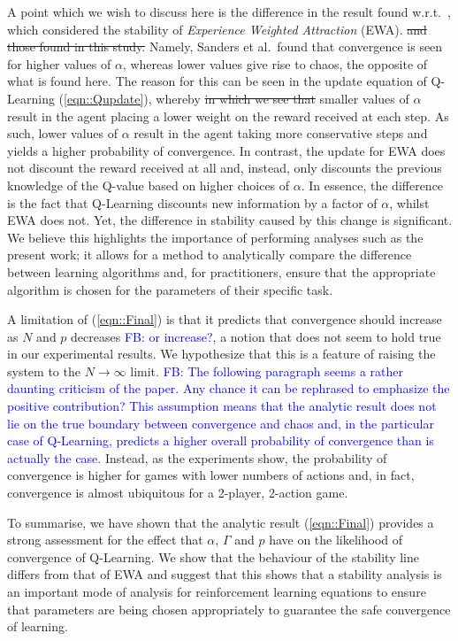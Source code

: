 \documentclass[sigconf,anonymous]{aamas}
\newcommand\fb[1]{\textcolor{blue}{FB: #1}}
\begin{document}
A point which we wish to discuss here is the difference in the result found w.r.t.~\cite{Sanders2018}, which considered the stability of \textit{Experience Weighted Attraction} (EWA). \st{and those found in this study.} Namely, Sanders et al.~found that convergence is seen for higher values of $\alpha$, whereas lower values give rise to chaos, the opposite of what is found here. The reason for this can be seen in the update equation of Q-Learning (\ref{eqn::Qupdate}), whereby
\st{in which we see that} 
smaller values of $\alpha$ result in the agent placing a lower weight on the reward received at each step. As such, lower values of $\alpha$ result in the agent taking more conservative steps and yields a higher probability of convergence. In contrast, the update for EWA does not discount the reward received at all and, instead, only discounts the previous knowledge of the Q-value based on higher choices of $\alpha$. In essence, the difference is the fact that Q-Learning discounts new information by a factor of $\alpha$, whilst EWA does not. Yet, the difference in stability caused by this change is significant. We believe this highlights the importance of performing analyses such as the present work; it allows for a method to analytically compare the difference between learning algorithms and, for practitioners, ensure that the appropriate algorithm is chosen for the parameters of their specific task.

A limitation of (\ref{eqn::Final}) is that it predicts that convergence should increase as $N$ and $p$ decreases \fb{or increase?}, a notion that does not seem to hold true in our experimental results. We hypothesize that this is a feature of raising the system to the $N \rightarrow \infty$ limit. \fb{The following paragraph seems a rather daunting criticism of the paper. Any chance it can be rephrased to emphasize the positive contribution?  This assumption means that the analytic result does not lie on the true boundary between convergence and chaos and, in the particular case of Q-Learning, predicts a higher overall probability of convergence than is actually the case.} Instead, as the experiments show, the probability of convergence is higher for games with lower numbers of actions and, in fact, convergence is almost ubiquitous for a 2-player, 2-action game. 

To summarise, we have shown that the analytic result (\ref{eqn::Final}) provides a strong assessment for the effect that $\alpha$, $\Gamma$ and $p$ have on the likelihood of convergence of Q-Learning. We show that the behaviour of the stability line differs from that of EWA and suggest that this shows that a stability analysis is an important mode of analysis for reinforcement learning equations to ensure that parameters are being chosen appropriately to guarantee the safe convergence of learning. 
\end{document}
